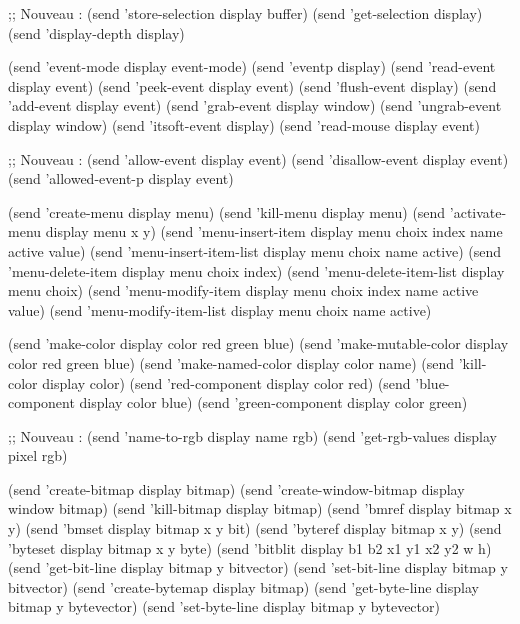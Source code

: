 ;; Nouveau :
(send 'store-selection display buffer)
(send 'get-selection display)
(send 'display-depth display)
\EndLL


\BeginLL
(send 'event-mode display event-mode)
(send 'eventp display)
(send 'read-event display event)
(send 'peek-event display event)
(send 'flush-event display)
(send 'add-event display event)
(send 'grab-event display window)
(send 'ungrab-event display window)
(send 'itsoft-event display)
(send 'read-mouse display event)

;; Nouveau :
(send 'allow-event display event)
(send 'disallow-event display event)
(send 'allowed-event-p display event)
\EndLL



\BeginLL
(send 'create-menu display menu)
(send 'kill-menu display menu)
(send 'activate-menu display menu x y)
(send 'menu-insert-item display menu choix index name active value)
(send 'menu-insert-item-list display menu choix name active)
(send 'menu-delete-item display menu choix index)
(send 'menu-delete-item-list display menu choix)
(send 'menu-modify-item display menu choix index name active value)
(send 'menu-modify-item-list display menu choix name active)
\EndLL



\BeginLL
(send 'make-color display color red green blue)
(send 'make-mutable-color display color red green blue)
(send 'make-named-color display color name)
(send 'kill-color display color)
(send 'red-component display color red)
(send 'blue-component display color blue)
(send 'green-component display color green)

;; Nouveau :
(send 'name-to-rgb display name rgb)
(send 'get-rgb-values display pixel rgb)
\EndLL



\BeginLL
(send 'create-bitmap display bitmap)
(send 'create-window-bitmap display window bitmap)
(send 'kill-bitmap display bitmap)
(send 'bmref display bitmap x y)
(send 'bmset display bitmap x y bit)
(send 'byteref display bitmap x y)
(send 'byteset display bitmap x y byte)
(send 'bitblit display b1 b2 x1 y1 x2 y2 w h)
(send 'get-bit-line display bitmap y bitvector)
(send 'set-bit-line display bitmap y bitvector)
(send 'create-bytemap display bitmap)
(send 'get-byte-line display bitmap y bytevector)
(send 'set-byte-line display bitmap y bytevector)

